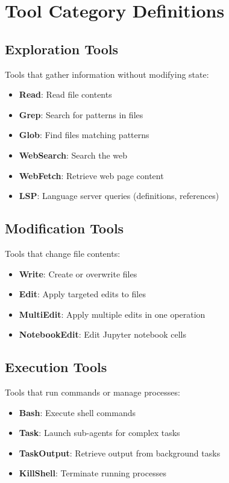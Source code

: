 \documentclass{ntlabs-preprint}
\begin{document}
\section{Tool Category Definitions}

\subsection{Exploration Tools}
Tools that gather information without modifying state:
\begin{itemize}
    \item \textbf{Read}: Read file contents
    \item \textbf{Grep}: Search for patterns in files
    \item \textbf{Glob}: Find files matching patterns
    \item \textbf{WebSearch}: Search the web
    \item \textbf{WebFetch}: Retrieve web page content
    \item \textbf{LSP}: Language server queries (definitions, references)
\end{itemize}

\subsection{Modification Tools}
Tools that change file contents:
\begin{itemize}
    \item \textbf{Write}: Create or overwrite files
    \item \textbf{Edit}: Apply targeted edits to files
    \item \textbf{MultiEdit}: Apply multiple edits in one operation
    \item \textbf{NotebookEdit}: Edit Jupyter notebook cells
\end{itemize}

\subsection{Execution Tools}
Tools that run commands or manage processes:
\begin{itemize}
    \item \textbf{Bash}: Execute shell commands
    \item \textbf{Task}: Launch sub-agents for complex tasks
    \item \textbf{TaskOutput}: Retrieve output from background tasks
    \item \textbf{KillShell}: Terminate running processes
\end{itemize}
\end{document}

